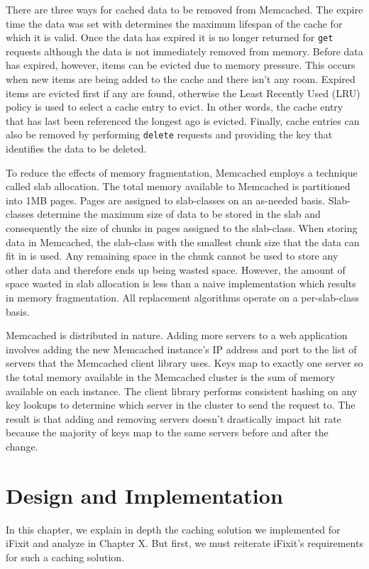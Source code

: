\documentclass[12pt]{ucthesis}
\begin{document}
There are three ways for cached data to be removed from \textsf{Memcached}.
The expire time the data was set with determines the maximum lifespan of the cache for which it is valid.
Once the data has expired it is no longer returned for {\tt get} requests although the data is not immediately removed from memory.
Before data has expired, however, items can be evicted due to memory pressure.
This occurs when new items are being added to the cache and there isn't any room.
Expired items are evicted first if any are found, otherwise the Least Recently Used (LRU) policy is used to select a cache entry to evict.
In other words, the cache entry that has last been referenced the longest ago is evicted.
Finally, cache entries can also be removed by performing {\tt delete} requests and providing the key that identifies the data to be deleted.

To reduce the effects of memory fragmentation, \textsf{Memcached} employs a technique called slab allocation.
The total memory available to \textsf{Memcached} is partitioned into 1MB pages.
Pages are assigned to slab-classes on an as-needed basis.
Slab-classes determine the maximum size of data to be stored in the slab and consequently the size of chunks in pages assigned to the slab-class.
When storing data in \textsf{Memcached}, the slab-class with the smallest chunk size that the data can fit in is used.
Any remaining space in the chunk cannot be used to store any other data and therefore ends up being wasted space.
However, the amount of space wasted in slab allocation is less than a naive implementation which results in memory fragmentation.
All replacement algorithms operate on a per-slab-class basis.

\textsf{Memcached} is distributed in nature.
Adding more servers to a web application involves adding the new \textsf{Memcached} instance's IP address and port to the list of servers that the \textsf{Memcached} client library uses.
Keys map to exactly one server so the total memory available in the \textsf{Memcached} cluster is the sum of memory available on each instance.
The client library performs consistent hashing\cite{consistentHashing} on any key lookups to determine which server in the cluster to send the request to.
The result is that adding and removing servers doesn't drastically impact hit rate because the majority of keys map to the same servers before and after the change.


\chapter{Design and Implementation} \label{designAndImplementation}
In this chapter, we explain in depth the caching solution we implemented for \textsf{iFixit} and analyze in Chapter X.
But first, we must reiterate \textsf{iFixit}'s requirements for such a caching solution.
\end{document}

